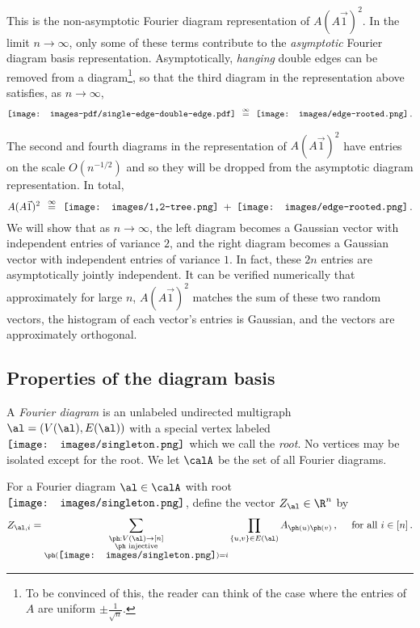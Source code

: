 \documentclass[12pt]{article}
\newcommand{\rootpic}{\vcenter{\hbox{\texttt{[image: images/singleton.png]}}}}
\newcommand{\smallrootpic}{\vcenter{\hbox{\texttt{[image: images/singleton.png]}}}}
\newcommand{\eqinf}{\,\overset{\infty}{=}\,}
\begin{document}
This is the non-asymptotic Fourier diagram representation of $A(A\vec{1})^2$.
In the limit $n \to \infty$, only some of these terms contribute
to the \textit{asymptotic} Fourier diagram basis representation. Asymptotically, \textit{hanging} double edges can be removed from a diagram\footnote{To be convinced of this, the reader can think of the case where the entries of $A$ are uniform $\pm \frac 1 {\sqrt n}$.},
so that the third diagram in the representation above satisfies, as $n\to\infty$,
\begin{align*}
    \vcenter{\hbox{\texttt{[image: images-pdf/single-edge-double-edge.pdf]}}} \;\eqinf\; \vcenter{\hbox{\texttt{[image: images/edge-rooted.png]}}}\,.
\end{align*}


The second and fourth diagrams in the representation of $A(A\vec{1})^2$ have entries on the scale $O(n^{-1/2})$ and so they will be dropped from the asymptotic diagram representation. In total,
\[
    A(A\vec{1})^{2} \;\eqinf\; \vcenter{\hbox{\texttt{[image: images/1,2-tree.png]}}} \;+\; \vcenter{\hbox{\texttt{[image: images/edge-rooted.png]}}}\,.
\]
We will show that as $n\to\infty$, the left diagram becomes a Gaussian vector with independent entries of variance $2$, and the right diagram becomes a Gaussian vector with independent entries of variance $1$. In fact, these $2n$ entries are asymptotically jointly independent. It can be verified numerically that approximately for large $n$, $A(A\vec{1})^{2}$ matches the sum of these two random vectors, the histogram of each vector's entries is Gaussian, and the vectors are approximately orthogonal.

\subsection{Properties of the diagram basis}
\label{sec:nonasymptotic-diagram-basis}

\begin{definition}
    \label{def:diagram}
    A \emph{Fourier diagram} is an unlabeled undirected multigraph $\al = (V(\al), E(\al))$
    with a special vertex labeled $\rootpic$ which we call the \textit{root}.
    No vertices may be isolated except for the root. We let $\calA$ be the set of all Fourier diagrams.
\end{definition}

\begin{definition}[$Z_\al$]
    \label{def:Zal}
    For a Fourier diagram $\al\in\calA$ with
    root $\rootpic$, define the vector $Z_\al \in \R^n$ by
    \[
        Z_{\al,i} = \sum_{\substack{\ph: V(\al) \to [n]\\\ph \textnormal{ injective}\\\ph(\smallrootpic) = i}} \prod_{\{u,v\} \in E(\al)} A_{\ph(u)\ph(v)}\,,\quad \text{ for all $i\in [n]$\,.}
    \]
\end{definition}
\end{document}
